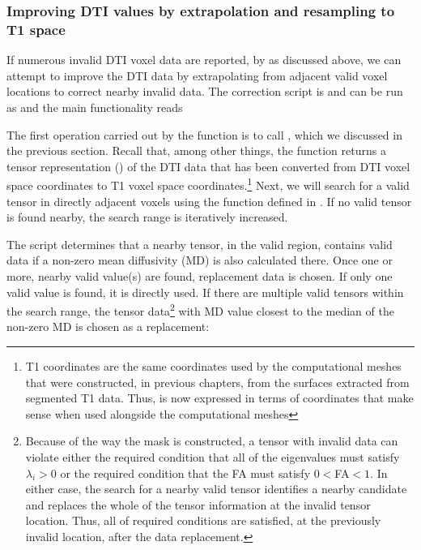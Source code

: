 \subsubsection*{Improving DTI values by extrapolation and resampling to T1 space}
If numerous invalid DTI voxel data are reported, by  as 
discussed above, we can attempt to improve the DTI data by extrapolating from 
adjacent valid voxel locations to correct nearby invalid data. The 
correction script is  and can be run as
\terminal{\$ cd mri2fem/chp5\\
\$ python3 clean\_dti\_data.py -{}-dti tensor.nii.gz -{}-mask mask.mgz -{}-out tensor-clean.nii}
\noindent and the main functionality reads 

The first operation carried out by the 
function is to call , which we
discussed in the previous section. Recall that, among other things,
the  function returns a tensor
representation () of the DTI data that has been converted from
DTI voxel space coordinates to T1 voxel space coordinates.\footnote{T1
  coordinates are the same coordinates used by the computational
  meshes that were constructed, in previous chapters, from the
  surfaces extracted from {\freesurfer} segmented T1 data. Thus,
   is now expressed in terms of coordinates that make sense
  when used alongside the computational meshes} Next, we will search
for a valid tensor in directly adjacent voxels using the function
 defined in
. If no valid tensor is found nearby, the
search range is iteratively increased.

The script determines that a nearby tensor, in the valid region,
contains valid data if a non-zero mean diffusivity (MD) is also
calculated there. Once one or more, nearby valid value(s) are found,
replacement data is chosen. If only one valid value is found, it is
directly used. If there are multiple valid tensors within the search
range, the tensor data\footnote{Because of the way the
   mask is constructed, a tensor with invalid data can
  violate either the required condition that all of the eigenvalues
  must satisfy $\lambda_i > 0$ or the required condition that the FA
  must satisfy $0<$FA$<1$. In either case, the search for a nearby
  valid tensor identifies a nearby candidate and replaces the whole of
  the tensor information at the invalid tensor location. Thus, all of
  required conditions are satisfied, at the previously invalid
  location, after the data replacement.} with MD value closest to the
median of the non-zero MD is chosen as a replacement:

